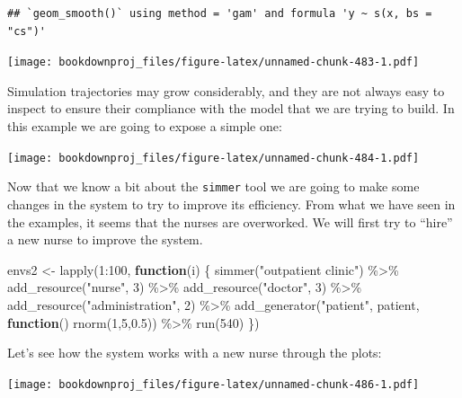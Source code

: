 \documentclass[
]{book}
\newenvironment{Shaded}{\begin{snugshade}}{\end{snugshade}}
\newcommand{\ControlFlowTok}[1]{\textcolor[rgb]{0.13,0.29,0.53}{\textbf{#1}}}
\newcommand{\DecValTok}[1]{\textcolor[rgb]{0.00,0.00,0.81}{#1}}
\newcommand{\FloatTok}[1]{\textcolor[rgb]{0.00,0.00,0.81}{#1}}
\newcommand{\FunctionTok}[1]{\textcolor[rgb]{0.00,0.00,0.00}{#1}}
\newcommand{\NormalTok}[1]{#1}
\newcommand{\OtherTok}[1]{\textcolor[rgb]{0.56,0.35,0.01}{#1}}
\newcommand{\SpecialCharTok}[1]{\textcolor[rgb]{0.00,0.00,0.00}{#1}}
\newcommand{\StringTok}[1]{\textcolor[rgb]{0.31,0.60,0.02}{#1}}
\begin{document}
\begin{verbatim}
## `geom_smooth()` using method = 'gam' and formula 'y ~ s(x, bs = "cs")'
\end{verbatim}

\texttt{[image: bookdownproj\_files/figure-latex/unnamed-chunk-483-1.pdf]}

Simulation trajectories may grow considerably, and they are not always easy to inspect to ensure their compliance with the model that we are trying to build. In this example we are going to expose a simple one:

\texttt{[image: bookdownproj\_files/figure-latex/unnamed-chunk-484-1.pdf]}

Now that we know a bit about the \texttt{simmer} tool we are going to make some changes in the system to try to improve its efficiency. From what we have seen in the examples, it seems that the nurses are overworked. We will first try to ``hire'' a new nurse to improve the system.

\begin{Shaded}
\begin{Highlighting}[]
\NormalTok{envs2 }\OtherTok{\textless{}{-}} \FunctionTok{lapply}\NormalTok{(}\DecValTok{1}\SpecialCharTok{:}\DecValTok{100}\NormalTok{, }\ControlFlowTok{function}\NormalTok{(i) \{}
  \FunctionTok{simmer}\NormalTok{(}\StringTok{"outpatient clinic"}\NormalTok{) }\SpecialCharTok{\%\textgreater{}\%}
    \FunctionTok{add\_resource}\NormalTok{(}\StringTok{"nurse"}\NormalTok{, }\DecValTok{3}\NormalTok{) }\SpecialCharTok{\%\textgreater{}\%}
    \FunctionTok{add\_resource}\NormalTok{(}\StringTok{"doctor"}\NormalTok{, }\DecValTok{3}\NormalTok{) }\SpecialCharTok{\%\textgreater{}\%}
    \FunctionTok{add\_resource}\NormalTok{(}\StringTok{"administration"}\NormalTok{, }\DecValTok{2}\NormalTok{) }\SpecialCharTok{\%\textgreater{}\%}
    \FunctionTok{add\_generator}\NormalTok{(}\StringTok{"patient"}\NormalTok{, patient, }\ControlFlowTok{function}\NormalTok{() }\FunctionTok{rnorm}\NormalTok{(}\DecValTok{1}\NormalTok{,}\DecValTok{5}\NormalTok{,}\FloatTok{0.5}\NormalTok{)) }\SpecialCharTok{\%\textgreater{}\%}
    \FunctionTok{run}\NormalTok{(}\DecValTok{540}\NormalTok{)}
\NormalTok{\})}
\end{Highlighting}
\end{Shaded}

Let's see how the system works with a new nurse through the plots:

\texttt{[image: bookdownproj\_files/figure-latex/unnamed-chunk-486-1.pdf]}
\end{document}
